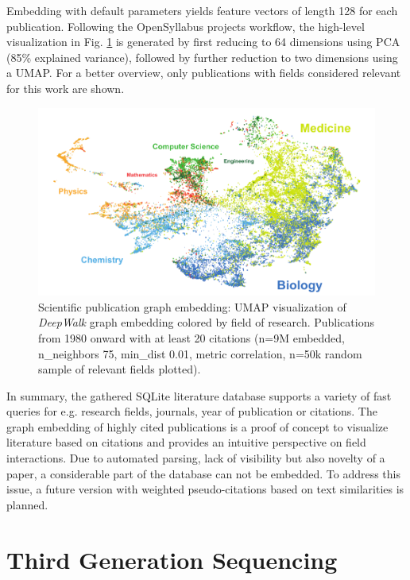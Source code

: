 Embedding with default parameters yields feature vectors of length 128 for each publication.
Following the OpenSyllabus projects workflow, the high-level visualization in Fig. \ref{fig:state_of_art:umap_global} is generated by first reducing to 64 dimensions using PCA (85\% explained variance), followed by further reduction to two dimensions using a UMAP.
For a better overview, only publications with fields considered relevant for this work are shown.

\begin{figure}[h]
	\centering
	\includegraphics[width=1.0\textwidth]{figures/state_of_art/umap_global.pdf}
	\captionsetup{format=plain}
	\caption[Scientific literature graph]{Scientific publication graph embedding: UMAP visualization of \textit{DeepWalk} graph embedding colored by field of research. Publications from 1980 onward with at least 20 citations (n=9M embedded, n\_neighbors 75, min\_dist 0.01, metric correlation, n=50k random sample of relevant fields plotted).}
	\label{fig:state_of_art:umap_global}
\end{figure}

In summary, the gathered SQLite literature database supports a variety of fast queries for e.g. research fields, journals, year of publication or citations.
The graph embedding of highly cited publications is a proof of concept to visualize literature based on citations and provides an intuitive perspective on field interactions.
Due to automated parsing, lack of visibility but also novelty of a paper, a considerable part of the database can not be embedded.
To address this issue, a future version with weighted pseudo-citations based on text similarities is planned.




\section{Third Generation Sequencing}
\label{sec:state_of_art:third_generation}

